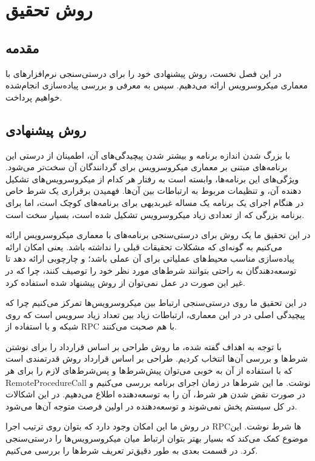 \chapter{روش تحقیق}
\section{مقدمه} 
در این فصل نخست، روش پیشنهادی خود را برای درستی‌سنجی نرم‌افزارهای با معماری میکروسرویس ارائه می‌دهیم. سپس به معرفی و بررسی پیاده‌سازی انجام‌شده خواهیم پرداخت.

\section{روش پیشنهادی}
با بزرگ شدن اندازه برنامه و بیشتر شدن پیچیدگی‌های آن، اطمینان از درستی این برنامه‌های مبتنی بر معماری میکروسرویس برای گردانندگان آن سخت‌تر می‌شود. ویژگی‌های این برنامه‌ها، وابسته است به رفتار هر کدام از میکروسرویس‌های تشکیل دهنده آن، و تنظیمات مربوط به ارتباطات بین آن‌ها. فهمیدن برقراری یک شرط خاص در هنگام اجرای یک برنامه یک مساله غیربدیهی برای برنامه‌های کوچک است، اما برای برنامه بزرگی که از تعدادی زیاد میکروسرویس تشکیل شده است، بسیار سخت است.

در این تحقیق ما یک روش برای درستی‌سنجی برنامه‌های با معماری میکروسرویس ارائه می‌کنیم به گونه‌ای که مشکلات تحقیقات قبلی را نداشته باشد. یعنی امکان ارائه پیاده‌سازی مناسب محیط‌های عملیاتی برای آن عملی باشد؛ و چارچوبی ارائه دهد تا توسعه‌دهندگان به راحتی بتوانند شرط‌های مورد نظر خود را توصیف کنند، چرا که در غیر این صورت در عمل نمی‌توان از روش پیشنهاد شده استفاده کرد.

در این تحقیق ما روی درستی‌سنجی ارتباط بین میکروسرویس‌ها تمرکز می‌کنیم چرا که پیچیدگی اصلی در در این معماری، ارتباطات زیاد بین تعداد زیاد سرویس است که روی شبکه و با استفاده از
\gls{RPC}
با هم صحبت می‌کنند.

با توجه به اهداف گفته شده، ما روش طراحی بر اساس قرارداد را برای نوشتن شرط‌ها و بررسی آن‌ها انتخاب کردیم. طراحی بر اساس قرارداد روش قدرتمندی است که با استفاده از آن به خوبی می‌توان پیش‌شرط‌ها و پس‌شرط‌های لازم را برای هر
\gls{RemoteProcedureCall}
نوشت. ما این شرط‌ها در زمان اجرای برنامه بررسی می‌کنیم و در صورت نقض شدن هر شرط، آن را به توسعه‌دهنده اطلاع می‌دهیم. در این اشکالات در کل سیستم پخش نمی‌شوند و توسعه‌دهنده در اولین فرصت متوجه آن‌ها می‌شود. 

در روش ما این امکان وجود دارد که بتوان روی ترتیب اجرا
\gls{RPC}ها
شرط نوشت. این موضوع کمک می‌کند که بسیار بهتر بتوان ارتباط میان میکروسرویس‌ها را درستی‌سنجی کرد. در قسمت بعدی به طور دقیق‌تر تعریف شرط‌ها را بررسی می‌کنیم. 

